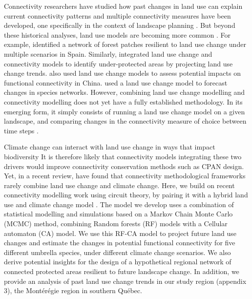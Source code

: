 Connectivity researchers have studied how past changes in land use can explain current connectivity patterns \citep{dupras_urban_2015, henareh_khalyani_spatial_2013, vergara_deforestation_2013, patru-stupariu_using_2013} and multiple connectivity measures have been developed, one specifically in the context of landscape planning \citep{saura_new_2007}. But beyond these historical analyses, land use models are becoming more common \citep{correa_ayram_habitat_2015}. For example, \cite{rubio_sustaining_2012} identified a network of forest patches resilient to land use change under multiple scenarios in Spain. Similarly, \cite{piquer-rodriguez_future_2012} integrated land use change and connectivity models to identify under-protected areas by projecting land use change trends. \cite{huang_simulating_2018} also used land use change models to assess potential impacts on functional connectivity in China. \cite{albert_applying_2017} used a land use change model to forecast changes in species networks. However, combining land use change modelling and connectivity modelling does not yet have a fully established methodology. In its emerging form, it simply consists of running a land use change model on a given landscape, and comparing changes in the connectivity measure of choice between time steps \citep{perkl_urban_2018}.

Climate change can interact with land use change in ways that impact biodiversity \citep{oliver_interactions_2014} It is therefore likely that connectivity models integrating these two drivers would improve connectivity conservation methods such as CPAN design. Yet, in a recent review, \cite{costanza_landscape_2019} have found that connectivity methodological frameworks rarely combine  land use change and climate change. Here, we build on recent connectivity modelling work using circuit theory, by pairing it with a hybrid land use and climate change model \citep{albert_applying_2017}. The model we develop uses a combination of statistical modelling and simulations based on a Markov Chain Monte Carlo (MCMC) method, combining Random forests (RF) models with a Cellular automaton (CA) model. We use this RF-CA model to project future land use changes and estimate the changes in potential functional connectivity for five different umbrella species, under different climate change scenarios. We also derive potential insights for the design of a hypothetical regional network of connected protected areas resilient to future landscape change. In addition, we provide an analysis of past land use change trends in our study region (appendix 3), the Montérégie region in southern Québec.

